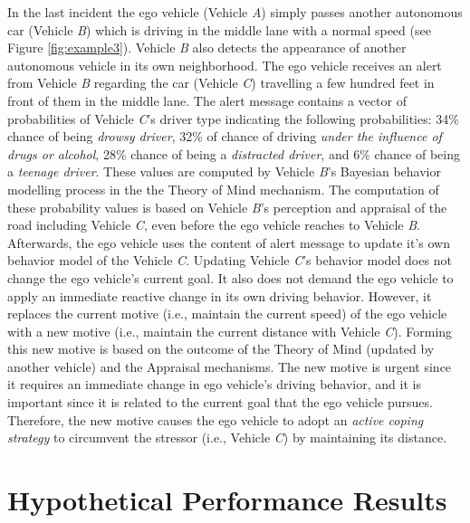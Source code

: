 \documentclass[journal, 11pt]{IEEEtran}
\begin{document}
In the last incident the ego vehicle (Vehicle \textit{A}) simply passes another
autonomous car (Vehicle \textit{B}) which is driving in the middle lane with a
normal speed (see Figure \ref{fig:example3}). Vehicle \textit{B} also detects
the appearance of another autonomous vehicle in its own neighborhood. The ego
vehicle receives an alert from Vehicle \textit{B} regarding the car (Vehicle
\textit{C}) travelling a few hundred feet in front of them in the middle lane.
The alert message contains a vector of probabilities of Vehicle \textit{C}'s
driver type indicating the following probabilities: 34\% chance of being
\textit{drowsy driver}, 32\% of chance of driving \textit{under the influence of
drugs or alcohol}, 28\% chance of being a \textit{distracted driver}, and 6\%
chance of being a \textit{teenage driver}. These values are computed by 
Vehicle \textit{B}'s Bayesian behavior modelling process in the the Theory of
Mind mechanism. The computation of these probability values is based on Vehicle
\textit{B}'s perception and appraisal of the road including Vehicle \textit{C},
even before the ego vehicle reaches to Vehicle \textit{B}. Afterwards, the ego
vehicle uses the content of alert message to update it's own behavior model
of the Vehicle \textit{C}. Updating Vehicle \textit{C}'s behavior model does not
change the ego vehicle's current goal. It also does not demand the ego vehicle
to apply an immediate reactive change in its own driving behavior. However, it
replaces the current motive (i.e., maintain the current speed) of the ego
vehicle with a new motive (i.e., maintain the current distance with Vehicle
\textit{C}). Forming this new motive is based on the outcome of the Theory of
Mind (updated by another vehicle) and the Appraisal mechanisms. The new motive
is urgent since it requires an immediate change in ego vehicle's driving
behavior, and it is important since it is related to the current goal that the
ego vehicle pursues. Therefore, the new motive causes the ego vehicle to adopt
an \textit{active coping strategy} to circumvent the stressor (i.e., Vehicle
\textit{C}) by maintaining its distance.

\section{Hypothetical Performance Results}
\end{document}
